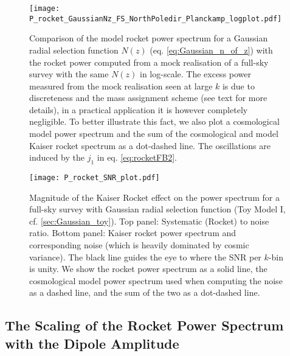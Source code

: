 \documentclass[a4paper,11pt]{article}
\begin{document}
\begin{figure}
    \centering
    \texttt{[image: P\_rocket\_GaussianNz\_FS\_NorthPoledir\_Planckamp\_logplot.pdf]}
    \caption{Comparison of the model rocket power spectrum for a Gaussian radial selection function $N(z)$ (eq. \eqref{eq:Gaussian_n_of_z}) with the rocket power computed from a mock realisation of a full-sky survey with the same $N(z)$ in log-scale. The excess power measured from the mock realisation seen at large $k$ is due to discreteness and the mass assignment scheme (see text for more details), in a practical application it is however completely negligible. To better illustrate this fact, we also plot a cosmological model power 
     spectrum and the sum of the cosmological and model Kaiser rocket spectrum as a dot-dashed line. The oscillations are induced by the $j_1$ in eq. \eqref{eq:rocketFB2}.}
    \label{fig:Gaussian_P}
\end{figure}

\begin{figure}
    \centering
    \texttt{[image: P\_rocket\_SNR\_plot.pdf]}
    \caption{Magnitude of the Kaiser Rocket effect on the power spectrum for a full-sky survey with Gaussian radial selection function (Toy Model I, cf. \ref{sec:Gaussian_toy}). Top panel: Systematic (Rocket) to noise ratio. Bottom panel: Kaiser rocket power spectrum and corresponding noise (which is heavily dominated by cosmic variance). The black line guides the eye to where the SNR 
    per $k$-bin is unity. We show the rocket power spectrum as a solid line, the cosmological model power 
    spectrum used when computing the noise as a dashed line, and the sum of the two as a dot-dashed line.}
    \label{fig:Gaussian_SNR}
\end{figure}

\subsection{The Scaling of the Rocket Power Spectrum with the Dipole Amplitude}
\end{document}
